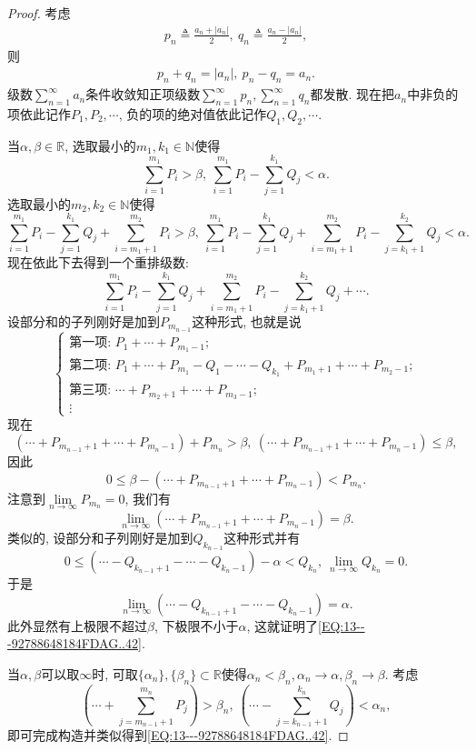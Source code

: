 \documentclass[../../main.tex]{subfiles}
\begin{document}
\begin{proof}
考虑
\begin{align}\label{EQ:13---92788648184FDAG..43}
p_n\triangleq\frac{a_n+|a_n|}{2},\ q_n\triangleq\frac{a_n-|a_n|}{2},
\end{align}
则
\begin{align}\label{EQ:13---92788648184FDAG..44}
p_n+q_n=|a_n|,\ p_n-q_n=a_n.
\end{align}
级数$\sum\limits_{n=1}^{\infty}a_n$条件收敛知正项级数$\sum\limits_{n=1}^{\infty}p_n,\sum\limits_{n=1}^{\infty}q_n$都发散. 现在把$a_n$中非负的项依此记作$P_1,P_2,\cdots$, 负的项的绝对值依此记作$Q_1,Q_2,\cdots$.

当$\alpha,\beta\in\mathbb{R}$, 选取最小的$m_1,k_1\in\mathbb{N}$使得
$$\sum_{i=1}^{m_1}P_i>\beta,\ \sum_{i=1}^{m_1}P_i-\sum_{j=1}^{k_1}Q_j<\alpha.$$
选取最小的$m_2,k_2\in\mathbb{N}$使得
$$\sum_{i=1}^{m_1}P_i-\sum_{j=1}^{k_1}Q_j+\sum_{i=m_1+1}^{m_2}P_i>\beta,\ \sum_{i=1}^{m_1}P_i-\sum_{j=1}^{k_1}Q_j+\sum_{i=m_1+1}^{m_2}P_i-\sum_{j=k_1+1}^{k_2}Q_j<\alpha.$$
现在依此下去得到一个重排级数:
$$\sum_{i=1}^{m_1}P_i-\sum_{j=1}^{k_1}Q_j+\sum_{i=m_1+1}^{m_2}P_i-\sum_{j=k_1+1}^{k_2}Q_j+\cdots.$$
设部分和的子列刚好是加到$P_{m_{n-1}}$这种形式, 也就是说
$$
\begin{cases}
\text{第一项: } P_1+\cdots+P_{m_1-1}; \\
\text{第二项: } P_1+\cdots+P_{m_1}-Q_1-\cdots-Q_{k_1}+P_{m_1+1}+\cdots+P_{m_2-1}; \\
\text{第三项: } \cdots+P_{m_2+1}+\cdots+P_{m_3-1}; \\
\vdots
\end{cases}
$$
现在
$$(\cdots+P_{m_{n-1}+1}+\cdots+P_{m_n-1})+P_{m_n}>\beta,\ (\cdots+P_{m_{n-1}+1}+\cdots+P_{m_n-1})\leqslant\beta,$$
因此
$$0\leqslant\beta-(\cdots+P_{m_{n-1}+1}+\cdots+P_{m_n-1})<P_{m_n}.$$
注意到$\lim\limits_{n\to\infty}P_{m_n}=0$, 我们有
$$\lim\limits_{n\to\infty}(\cdots+P_{m_{n-1}+1}+\cdots+P_{m_n-1})=\beta.$$
类似的, 设部分和子列刚好是加到$Q_{k_{n-1}}$这种形式并有
$$0\leqslant(\cdots-Q_{k_{n-1}+1}-\cdots-Q_{k_n-1})-\alpha<Q_{k_n},\ \lim\limits_{n\to\infty}Q_{k_n}=0.$$
于是
$$\lim\limits_{n\to\infty}(\cdots-Q_{k_{n-1}+1}-\cdots-Q_{k_n-1})=\alpha.$$
此外显然有上极限不超过$\beta$, 下极限不小于$\alpha$, 这就证明了\eqref{EQ:13---92788648184FDAG..42}.

当$\alpha,\beta$可以取$\infty$时, 可取$\{\alpha_n\},\{\beta_n\}\subset\mathbb{R}$使得$\alpha_n<\beta_n,\alpha_n\to\alpha,\beta_n\to\beta$. 考虑
$$\left(\cdots+\sum_{j=m_{n-1}+1}^{m_n}P_j\right)>\beta_n,\ \left(\cdots-\sum_{j=k_{n-1}+1}^{k_n}Q_j\right)<\alpha_n,$$
即可完成构造并类似得到\eqref{EQ:13---92788648184FDAG..42}.
\end{proof}
\end{document}
